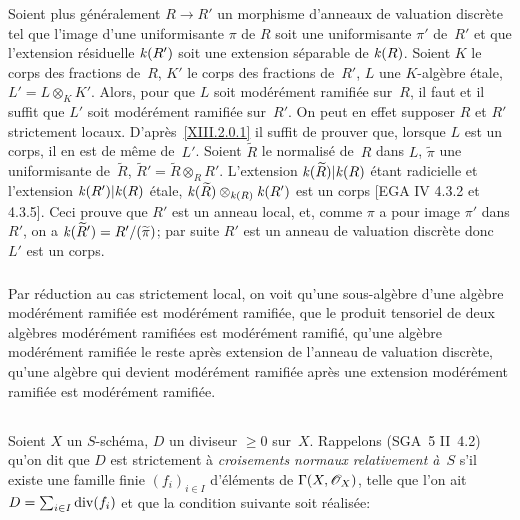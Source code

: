 Soient plus g\'en\'eralement $R \to R'$ un morphisme d'anneaux de
valuation discr\`ete tel que l'image d'une uniformisante $\pi$ de
$R$ soit une uniformisante $\pi'$ de~$R'$ et que l'extension
r\'esiduelle $\mathit{k}(R')$ soit une extension s\'eparable de
$\mathit{k}(R)$. Soient $K$ le corps des fractions de~$R$, $K'$ le corps des
fractions de~$R'$, $L$ une $K$-alg\`ebre \'etale, $L' = L
\otimes_K K'$. Alors, pour que $L$ soit mod\'er\'ement
ramifi\'ee sur~$R$, il faut et il suffit que $L'$ soit
mod\'er\'ement ramifi\'ee sur~$R'$. On peut en effet supposer
$R$ et $R'$ strictement locaux. D'apr\`es~\ref{XIII.2.0.1} il suffit
de prouver que, lorsque $L$ est un corps, il en est de m\^eme de~$L'$. Soient $\tilde{R}$ le normalis\'e de~$R$ dans $L$,
$\tilde{\pi}$ une uniformisante de~$\tilde{R}$, $\tilde{R}' =
\tilde{R} \otimes_R R'$. L'extension $\mathit{k}(\widetilde{R})|\mathit{k}(R)$ \'etant
radicielle et l'extension $\mathit{k}(R')|\mathit{k}(R)$ \'etale,
$\mathit{k}(\widetilde{R})\otimes_{\mathit{k}(R)}\mathit{k}(R')$ est un corps [EGA IV 4.3.2 et
4.3.5]. Ceci prouve que $R'$ est un anneau local, et, comme $\pi$ a
pour image $\pi'$ dans $R'$, on a $\mathit{k}(\widetilde{R}')= R'/(\widetilde{\pi})$;
par suite $R'$ est un anneau de valuation discr\`ete \cite[ch.\, I \S 2
prop.\, 2]{XIII.5} donc $L'$ est un corps.

\subsubsection{}
\label{XIII.2.0.3}
Par r\'eduction au cas strictement local, on voit qu'une
sous-alg\`ebre d'une alg\`ebre mod\'er\'ement ramifi\'ee est
mod\'er\'ement ramifi\'ee, que le produit tensoriel de deux
alg\`ebres mod\'er\'ement ramifi\'ees est mod\'er\'ement
ramifi\'e, qu'une alg\`ebre mod\'er\'ement ramifi\'ee le
reste apr\`es extension de l'anneau de valuation discr\`ete,
qu'une alg\`ebre qui devient mod\'er\'ement ramifi\'ee
apr\`es une extension mod\'er\'ement ramifi\'ee est
mod\'er\'ement ramifi\'ee.

\subsection{}
\label{XIII.2.1}
Soient
$X$ un $S$-sch\'ema, $D$ un diviseur $\geq 0$ sur~$X$.
Rappelons (SGA~5 II~4.2) qu'on dit que $D$ est strictement \`a
\emph{croisements normaux relativement à}~$S$
s'il existe une famille finie $(f_i)_{i\in I}$ d'\'el\'ements de
$\Gamma(X,\cal{O}_X)$, telle que l'on ait $D=\sum_{i\in
I}\operatorname{\mathrm{div}}(f_i)$ et que la condition suivante soit r\'ealis\'ee:

